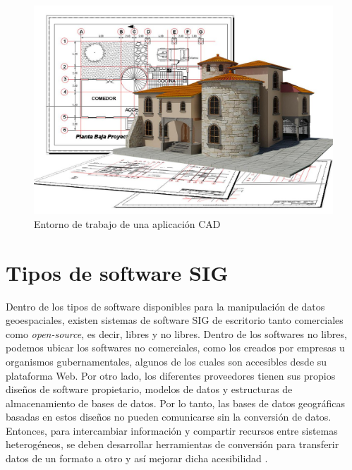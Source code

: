 \begin{figure}[H]
	\centering
	\includegraphics[width=0.75\linewidth]{imagenes/capitulo2/C4nMJdNWcAAoub7}
	\caption{Entorno de trabajo de una aplicación CAD  \cite{sig-cad}}
	\label{fig:c4nmjdnwcaaoub7}
\end{figure}




\section{Tipos de software SIG}

Dentro de los tipos de software disponibles para la manipulación de datos geoespaciales, existen sistemas de software SIG de escritorio tanto comerciales como \textit{open-source}, es decir, libres y no libres. Dentro de los softwares no libres, podemos ubicar los softwares no comerciales, como los creados por empresas u organismos gubernamentales, algunos de los cuales son accesibles desde su plataforma Web. Por otro lado, los diferentes proveedores tienen sus propios diseños de software propietario, modelos de datos y estructuras de almacenamiento de bases de datos. Por lo tanto, las bases de datos geográficas basadas en estos diseños no pueden comunicarse sin la conversión de datos. Entonces, para intercambiar información y compartir recursos entre sistemas heterogéneos, se deben desarrollar herramientas de conversión para transferir datos de un formato a otro y así mejorar dicha acesibilidad \cite{libro-gis}. \\


